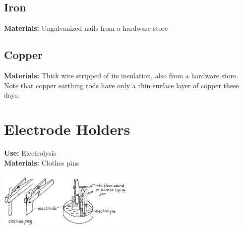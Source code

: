 \begin{multicols}{2}
\columnbreak

\subsection{Iron} 
\vspace{-6pt}
\textbf{Materials:} Ungalvanized nails from a hardware store
\subsection{Copper} 
\vspace{-6pt}
\textbf{Materials:} Thick wire stripped of its insulation, also from a hardware store. Note that copper earthing rods have only a thin surface layer of copper these days.

%

\section{Electrode Holders} 
\label{sec:electrode-holder}
\vspace{-10pt}
\textbf{Use:} Electrolysis\\
\textbf{Materials:} Clothes pins
\begin{center}
\includegraphics[width=0.49\textwidth]{./img/vso/electrode-holders.jpg}
\end{center}


\end{multicols}
